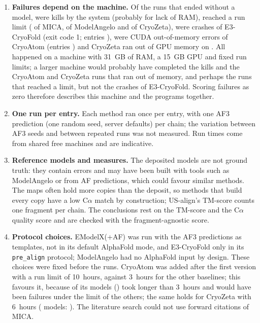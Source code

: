 \begin{enumerate}
\item \textbf{Failures depend on the machine.} Of the \FailTotal{} runs that ended without a model, \FailKill{} were kills by the system (probably for lack of RAM), \FailTimeout{} reached a run limit (\FailTimeoutMica{} of MICA, \FailTimeoutAngelo{} of ModelAngelo and \FailTimeoutCryozeta{} of CryoZeta), \FailCrashEthree{} were crashes of E3-CryoFold (exit code 1; entries \FailCrashListEthree{}), \FailCrashCryoatom{} were CUDA out-of-memory errors of CryoAtom (entries \FailCrashListCryoatom{}) and CryoZeta ran out of GPU memory on \FailCrashListCryozeta{}. All happened on a machine with 31~GB of RAM, a 15~GB GPU and fixed run limits; a larger machine would probably have completed the kills and the CryoAtom and CryoZeta runs that ran out of memory, and perhaps the runs that reached a limit, but not the crashes of E3-CryoFold. Scoring failures as zero therefore describes this machine and the programs together.
\item \textbf{One run per entry.} Each method ran once per entry, with one AF3 prediction (one random seed, server defaults) per chain; the variation between AF3 seeds and between repeated runs was not measured. Run times come from shared free machines and are indicative.
\item \textbf{Reference models and measures.} The deposited models are not ground truth: they contain errors and may have been built with tools such as ModelAngelo or from AF predictions, which could favour similar methods. The maps often hold more copies than the deposit, so methods that build every copy have a low C$\alpha$ match by construction; US-align's TM-score counts one fragment per chain. The conclusions rest on the TM-score and the C$\alpha$ quality score and are checked with the fragment-agnostic score.
\item \textbf{Protocol choices.} EModelX(+AF) was run with the AF3 predictions as templates, not in its default AlphaFold mode, and E3-CryoFold only in its \texttt{pre\_align} protocol; ModelAngelo had no AlphaFold input by design. These choices were fixed before the runs. CryoAtom was added after the first version with a run limit of 10~hours, against 3~hours for the other baselines; this favours it, because \NOverThreeHCryoatom{} of its models (\OverThreeHListCryoatom{}) took longer than 3~hours and would have been failures under the limit of the others; the same holds for CryoZeta with 6~hours (\NOverThreeHCryozeta{} models: \OverThreeHListCryozeta{}). The literature search could not use forward citations of MICA.

\end{enumerate}
